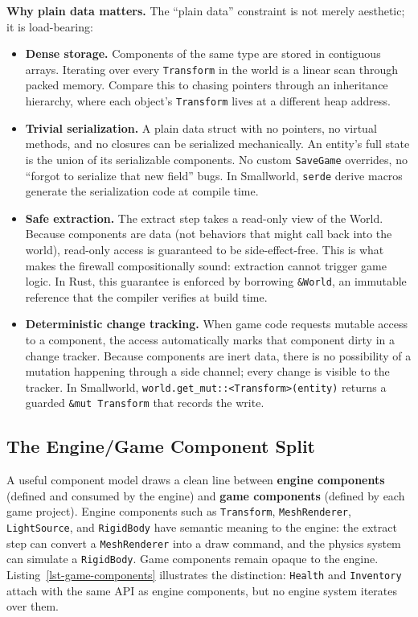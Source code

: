 \documentclass[
  11pt,
  letterpaper,
  DIV=11,
  numbers=noendperiod,
  twoside,
  open=right]{scrreprt}
\begin{document}
\textbf{Why plain data matters.} The ``plain data'' constraint is not
merely aesthetic; it is load-bearing:

\begin{itemize}
\item
  \textbf{Dense storage.} Components of the same type are stored in
  contiguous arrays. Iterating over every \texttt{Transform} in the
  world is a linear scan through packed memory. Compare this to chasing
  pointers through an inheritance hierarchy, where each object's
  \texttt{Transform} lives at a different heap address.
\item
  \textbf{Trivial serialization.} A plain data struct with no pointers,
  no virtual methods, and no closures can be serialized mechanically. An
  entity's full state is the union of its serializable components. No
  custom \texttt{SaveGame} overrides, no ``forgot to serialize that new
  field'' bugs. In Smallworld, \texttt{serde} derive macros generate the
  serialization code at compile time.
\item
  \textbf{Safe extraction.} The extract step takes a read-only view of
  the World. Because components are data (not behaviors that might call
  back into the world), read-only access is guaranteed to be
  side-effect-free. This is what makes the firewall compositionally
  sound: extraction cannot trigger game logic. In Rust, this guarantee
  is enforced by borrowing \texttt{\&World}, an immutable reference that
  the compiler verifies at build time.
\item
  \textbf{Deterministic change tracking.} When game code requests
  mutable access to a component, the access automatically marks that
  component dirty in a change tracker. Because components are inert
  data, there is no possibility of a mutation happening through a side
  channel; every change is visible to the tracker. In Smallworld,
  \texttt{world.get\_mut::\textless{}Transform\textgreater{}(entity)}
  returns a guarded \texttt{\&mut\ Transform} that records the write.
\end{itemize}

\subsection{The Engine/Game Component
Split}\label{the-enginegame-component-split}

A useful component model draws a clean line between \textbf{engine
components} (defined and consumed by the engine) and \textbf{game
components} (defined by each game project). Engine components such as
\texttt{Transform}, \texttt{MeshRenderer}, \texttt{LightSource}, and
\texttt{RigidBody} have semantic meaning to the engine: the extract step
can convert a \texttt{MeshRenderer} into a draw command, and the physics
system can simulate a \texttt{RigidBody}. Game components remain opaque
to the engine. Listing~\ref{lst-game-components} illustrates the
distinction: \texttt{Health} and \texttt{Inventory} attach with the same
API as engine components, but no engine system iterates over them.
\end{document}
